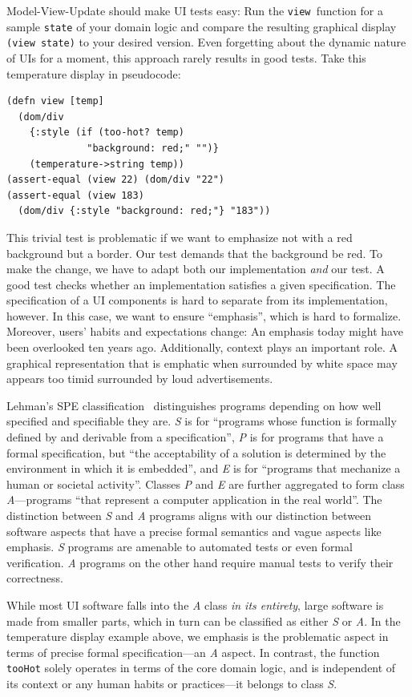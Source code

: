 \documentclass[sigplan,screen]{acmart}
\begin{document}
Model-View-Update should make UI tests easy: Run the
\texttt{view }function for a sample \texttt{state} of
your domain logic and compare the resulting graphical display
\texttt{(view state)} to your desired version. Even forgetting about
the dynamic nature of UIs for a moment, this approach rarely results
in good tests. Take this temperature display in pseudocode:
%
\begin{verbatim}
(defn view [temp]
  (dom/div
    {:style (if (too-hot? temp)
              "background: red;" "")}
    (temperature->string temp))
(assert-equal (view 22) (dom/div "22")
(assert-equal (view 183)
  (dom/div {:style "background: red;"} "183"))
\end{verbatim}
%
This trivial test is problematic if we want to emphasize
not with a red background but a border.  Our test
demands that the background be red. To make the change,
we have to adapt both our implementation \textit{and} our
test.
A good
test checks whether an implementation satisfies a given specification.
The specification of a
UI components is hard to separate from its implementation,
however. In this case, we want to ensure ``emphasis'', which 
is hard to formalize. Moreover, users' habits and expectations
change: An emphasis today might have been overlooked ten years ago. Additionally,
context plays an important role. A graphical representation that is
emphatic when surrounded by white space may appears too timid
surrounded by loud advertisements.

Lehman's SPE classification~\cite{SPE} distinguishes programs
depending on how well specified and specifiable they are.
\textit{S} is for ``programs whose function is formally defined by and
derivable from a specification'', \textit{P} is for programs that have
a formal specification, but ``the acceptability of a solution is
determined by the environment in which it is embedded'', and
\textit{E} is for ``programs that mechanize a human or societal
activity''. Classes \textit{P} and \textit{E} are further aggregated
to form class \textit{A}---programs ``that represent a computer
application in the real world''. The distinction between \textit{S}
and \textit{A} programs aligns with our distinction between software
aspects that have a precise formal semantics and vague aspects like
emphasis. \textit{S} programs are amenable to automated tests
or even formal verification. \textit{A} programs on the other hand require manual tests to
verify their correctness.

While most UI software falls into the \textit{A} class \textit{in its
  entirety}, large software is made from smaller parts, which in turn
can be classified as either \textit{S} or \textit{A}. In the
temperature display example above, we
emphasis is the problematic aspect in terms of precise formal
specification---an \textit{A} aspect. In contrast, the function
\texttt{tooHot} solely operates in terms of the core domain
logic, and is independent of its context or any human habits
or practices---it belongs to class \textit{S}.
\end{document}
